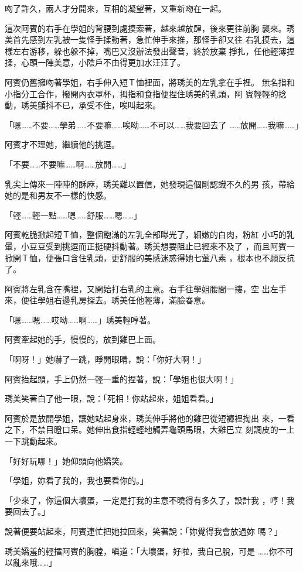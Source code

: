 吻了許久，兩人才分開來，互相的凝望著，又重新吻在一起。

這次阿賓的右手在學姐的背腰到處摸索著，越來越放肆，後來更往前胸
襲來。琇美首先感到左乳被一隻怪手揉動著，急忙伸手來推，那怪手卻又往
右乳摸去，這樣左右游移，躲也躲不掉，嘴巴又沒辦法發出聲音，終於放棄
掙扎，任他輕薄捏揉，心頭一陣美意，小陰戶不由得更加水汪汪了。

阿賓仍舊擁吻著學姐，右手伸入短Ｔ恤裡面，將琇美的左乳拿在手裡。
無名指和小指分工合作，撥開內衣罩杯，拇指和食指便捏住琇美的乳頭，阿
賓輕輕的捻動，琇美顫抖不已，承受不住，唉叫起來。

「嗯……不要……學弟……不要嘛……唉呦……不可以……我要回去了
……放開……我嘛……」

阿賓才不理她，繼續他的挑逗。

「不要……不要嘛……啊……放開……」

乳尖上傳來一陣陣的酥麻，琇美難以置信，她發現這個剛認識不久的男
孩，帶給她的是和男友不一樣的快感。

「輕……輕一點……嗯……舒服……嗯……」

阿賓乾脆掀起短Ｔ恤，整個飽滿的左乳全部曝光了，細嫩的白肉，粉紅
小巧的乳暈，小豆豆受到挑逗而正挺硬抖動著。琇美想要阻止已經來不及了
，而且阿賓一掀開Ｔ恤，便張口含住乳頭，更舒服的美感迷惑得她七葷八素
，根本也不願反抗了。

阿賓將左乳含在嘴裡，又開始打右乳的主意。右手往學姐腰間一摟，空
出左手來，便往學姐右邊乳房探去。琇美任他輕薄，滿臉春意。

「嗯……嗯……哎呦……啊……」琇美輕哼著。

阿賓牽起她的手，慢慢的，放到雞巴上面。

「啊呀！」她嚇了一跳，睜開眼睛，說：「你好大啊！」

阿賓抬起頭，手上仍然一輕一重的捏著，說：「學姐也很大啊！」

琇美笑著白了他一眼，說：「死相！你站起來，姐姐看看。」

阿賓於是放開學姐，讓她站起身來，琇美伸手將他的雞巴從短褲裡掏出
來，一看之下，不禁目瞪口呆。她伸出食指輕輕地觸弄龜頭馬眼，大雞巴立
刻調皮的一上一下跳動起來。

「好好玩哪！」她仰頭向他嬌笑。

「學姐，妳看了我的，我也要看你的。」

「少來了，你這個大壞蛋，一定是打我的主意不曉得有多久了，設計我
，哼！我要回去了。」

說著便要站起來，阿賓連忙把她拉回來，笑著說：「妳覺得我會放過妳
嗎？」

琇美嬌羞的輕擂阿賓的胸膛，嗔道：「大壞蛋，好啦，我自己脫，可是
……你不可以亂來哦……」

